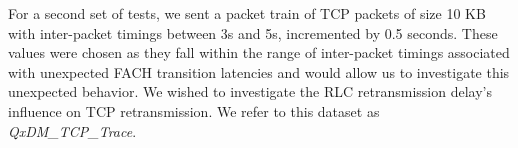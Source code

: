 For a second set of tests, we sent a packet train of TCP packets of size 10 KB with inter-packet timings between 3s and 5s, incremented by 0.5 seconds.  These values were chosen as they fall within the range of inter-packet timings associated with unexpected FACH transition latencies and would allow us to investigate this unexpected behavior. We wished to investigate the RLC retransmission delay's influence on TCP retransmission.  We refer to this dataset as \emph{QxDM\_{}TCP\_{}Trace}.



